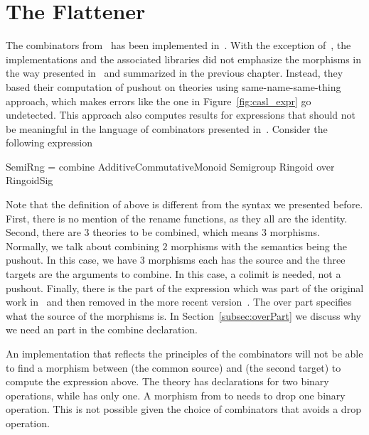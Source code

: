 \chapter{The Flattener}
\label{sec:lib_implementation}


The combinators from~\cite{carette2018building} has been implemented in~\cite{cicm2019diagrams, TPCProto, meta-prim-blog}. With the exception of~\cite{cicm2019diagrams}, the implementations and the associated libraries did not emphasize the morphisms in the way presented in~\cite{carette2018building} and summarized in the previous chapter. Instead, they based their computation of pushout on theories using same-name-same-thing approach, which makes errors like the one in Figure~\ref{fig:casl_expr} go undetected.  
This approach also computes results for expressions that should not be meaningful in the language of combinators presented in~\cite{carette2018building}. Consider the following expression
\begin{togcode}
SemiRng = combine AdditiveCommutativeMonoid Semigroup Ringoid
          over RingoidSig
\end{togcode}
Note that the definition of  above is different from the syntax we presented before. First, there is no mention of the rename functions, as they all are the identity. Second, there are $3$ theories to be combined, which means $3$ morphisms. Normally, we talk about combining $2$ morphisms with the semantics being the pushout. In this case, we have $3$ morphisms each has the source  and the three targets are the arguments to combine. In this case, a colimit is needed, not a pushout. Finally, there is the  part of the expression which was part of the original work in~\cite{CaretteOConnorTPC} and then removed in the more recent version~\cite{carette2018building}. The over part specifies what the source of the morphisms is. In Section~\ref{subsec:overPart} we discuss why we need an  part in the combine declaration. 

An implementation that reflects the principles of the combinators will not be able to find a morphism between  (the common source) and  (the second target) to compute the expression above. 
The theory  has declarations for two binary operations, while  has only one. A morphism from  to  needs to drop one binary operation. This is not possible given the choice of combinators that avoids a drop operation. 

